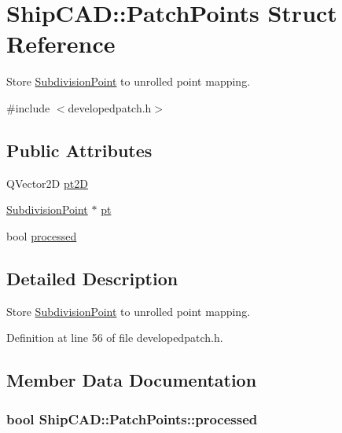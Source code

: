 \hypertarget{structShipCAD_1_1PatchPoints}{}\section{Ship\+C\+AD\+:\+:Patch\+Points Struct Reference}
\label{structShipCAD_1_1PatchPoints}


Store \hyperlink{classShipCAD_1_1SubdivisionPoint}{Subdivision\+Point} to unrolled point mapping.  




{\ttfamily \#include $<$developedpatch.\+h$>$}

\subsection*{Public Attributes}
\begin{DoxyCompactItemize}
\item 
Q\+Vector2D \hyperlink{structShipCAD_1_1PatchPoints_abce4e4187927ae79ecd5aafd604c1785}{pt2D}
\item 
\hyperlink{classShipCAD_1_1SubdivisionPoint}{Subdivision\+Point} $\ast$ \hyperlink{structShipCAD_1_1PatchPoints_ac69ca0b5e51939979f4654afa3b210a9}{pt}
\item 
bool \hyperlink{structShipCAD_1_1PatchPoints_a2f52ed0dc9945823b211f9e067164dce}{processed}
\end{DoxyCompactItemize}


\subsection{Detailed Description}
Store \hyperlink{classShipCAD_1_1SubdivisionPoint}{Subdivision\+Point} to unrolled point mapping. 

Definition at line 56 of file developedpatch.\+h.



\subsection{Member Data Documentation}
\subsubsection[{\texorpdfstring{processed}{processed}}]{\setlength{\rightskip}{0pt plus 5cm}bool Ship\+C\+A\+D\+::\+Patch\+Points\+::processed}\hypertarget{structShipCAD_1_1PatchPoints_a2f52ed0dc9945823b211f9e067164dce}{}\label{structShipCAD_1_1PatchPoints_a2f52ed0dc9945823b211f9e067164dce}


